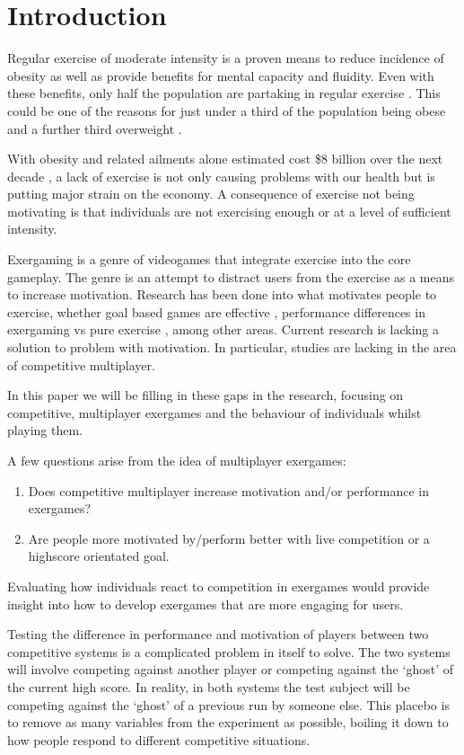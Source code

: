 \documentclass[11pt]{article}
\begin{document}
\section{Introduction}
\begin{multicols}{2}

Regular exercise of moderate intensity is a proven means to reduce incidence of obesity as well as provide benefits for mental capacity and fluidity. Even with these benefits, only half the population are partaking in regular exercise \cite{ministry2013new}. This could be one of the reasons for just under a third of the population being obese and a further third overweight \cite{ministry2013new}.

With obesity and related ailments alone estimated cost \$8 billion over the next decade \cite{lal2012health}, a lack of exercise is not only causing problems with our health but is putting major strain on the economy. A consequence of exercise not being motivating \cite{bartholomew2005college} is that individuals are not exercising enough or at a level of sufficient intensity.

Exergaming is a genre of videogames that integrate exercise into the core gameplay. The genre is an attempt to distract users from the exercise as a means to increase motivation. Research has been done into what motivates people to exercise, whether goal based games are effective \cite{jin2010does}, performance differences in exergaming vs pure exercise \cite{kraft2011heart,maddison2009feasibility}, among other areas. Current research is lacking a solution to problem with motivation. In particular, studies are lacking in the area of competitive multiplayer.

In this paper we will be filling in these gaps in the research, focusing on competitive, multiplayer exergames and the behaviour of individuals whilst playing them.

A few questions arise from the idea of multiplayer exergames:

\begin{enumerate}
	\item Does competitive multiplayer increase motivation and/or performance in exergames?
	\item Are people more motivated by/perform better with live competition or a highscore orientated goal.
\end{enumerate}

Evaluating how individuals react to competition in exergames would provide insight into how to develop exergames that are more engaging for users. 

Testing the difference in performance and motivation of players between two competitive systems is a complicated problem in itself to solve. The two systems will involve competing against another player or competing against the `ghost' of the current high score. In reality, in both systems the test subject will be competing against the `ghost' of a previous run by someone else. This placebo is to remove as many variables from the experiment as possible, boiling it down to how people respond to different competitive situations.

\end{multicols}
\end{document}
